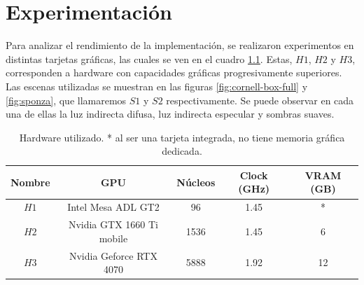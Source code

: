 \graphicspath{{chapters/5_experimentos/figures/}}

\chapter{Experimentación}\label{chap:experiments}

Para analizar el rendimiento de la implementación, se realizaron experimentos en distintas tarjetas gráficas, las cuales se ven en el cuadro \ref{tab:hardware-used}.
Estas, $H1$, $H2$ y $H3$, corresponden a hardware con capacidades gráficas progresivamente superiores.
Las escenas utilizadas se muestran en las figuras \ref{fig:cornell-box-full} y \ref{fig:sponza}, que llamaremos $S1$ y $S2$ respectivamente.
Se puede observar en cada una de ellas la luz indirecta difusa, luz indirecta especular y sombras suaves.

\begin{table}[ht]
	\centering
	\begin{tabular}{|c|c|c|c|c|}
		\hline
		\textbf{Nombre} & \textbf{GPU} & \textbf{Núcleos} & \textbf{Clock (GHz)} & \textbf{VRAM (GB)} \\
		\hline
		$H1$ & Intel Mesa ADL GT2 & 96 & 1.45 & * \\
		\hline
		$H2$ & Nvidia GTX 1660 Ti mobile & 1536 & 1.45 & 6 \\
		\hline
		$H3$ & Nvidia Geforce RTX 4070 & 5888 & 1.92 & 12 \\
		\hline
	\end{tabular}
	\caption{Hardware utilizado. * al ser una tarjeta integrada, no tiene memoria gráfica dedicada.}
	\label{tab:hardware-used}
\end{table}

